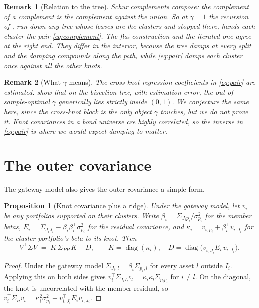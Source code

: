 \documentclass[11pt]{article}
\DeclareMathOperator{\diag}{diag}
\newtheorem{proposition}{Proposition}
\newtheorem{remark}{Remark}
\begin{document}
\begin{remark}[Relation to the tree]
Schur complements compose: the complement of a complement is the complement
against the union. So at $\gamma=1$ the recursion of
\textcite{cotton2024schur}, run down any tree whose leaves are the clusters
and stopped there, hands each cluster the pair \eqref{eq:complement}. The
flat construction and the iterated one agree at the right end. They differ
in the interior, because the tree damps at every split and the damping
compounds along the path, while \eqref{eq:pair} damps each cluster once
against all the other knots.
\end{remark}

\begin{remark}[What $\gamma$ means]
The cross-knot regression coefficients in \eqref{eq:pair} are estimated.
\textcite{cotton2026bridge} show that on the bisection tree, with
estimation error, the out-of-sample-optimal $\gamma$ generically lies
strictly inside $(0,1)$. We conjecture the same here, since the cross-knot
block is the only object $\gamma$ touches, but we do not prove it. Knot
covariances in a bond universe are highly correlated, so the inverse in
\eqref{eq:pair} is where we would expect damping to matter.
\end{remark}

\section{The outer covariance}

The gateway model also gives the outer covariance a simple form.

\begin{proposition}[Knot covariance plus a ridge]
\label{prop:outer}
Under the gateway model, let $v_i$ be any portfolios supported on their
clusters. Write $\beta_i=\Sigma_{J_ip_i}/\sigma_{p_i}^2$ for the member
betas, $E_i=\Sigma_{J_iJ_i}-\beta_i\beta_i^\top\sigma_{p_i}^2$ for the
residual covariance, and $\kappa_i=v_{i,p_i}+\beta_i^\top v_{i,J_i}$ for
the cluster portfolio's beta to its knot. Then
\begin{equation}
  V^\top\Sigma V \;=\; K\,\Sigma_{PP}\,K + D,
  \qquad K=\diag(\kappa_i),
  \quad D=\diag\!\big(v_{i,J_i}^\top E_i\,v_{i,J_i}\big).
  \label{eq:outer}
\end{equation}
\end{proposition}

\begin{proof}
Under the gateway model $\Sigma_{J_i,l}=\beta_i\Sigma_{p_i,l}$ for every
asset $l$ outside $I_i$. Applying this on both sides gives
$v_i^\top\Sigma_{I_iI_l}v_l=\kappa_i\kappa_l\Sigma_{p_ip_l}$ for $i\neq l$.
On the diagonal, the knot is uncorrelated with the member residual, so
$v_i^\top\Sigma_{ii}v_i=\kappa_i^2\sigma_{p_i}^2+v_{i,J_i}^\top E_iv_{i,J_i}$.
\end{proof}
\end{document}
